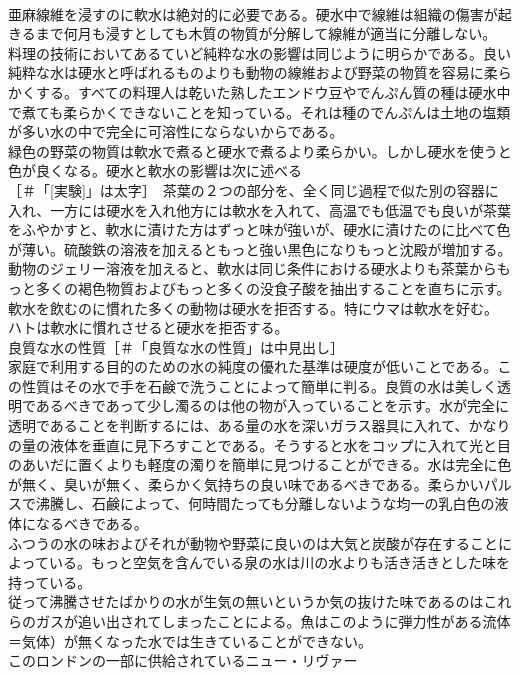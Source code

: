 \documentclass[8pt]{extreport}
\begin{document}
\begin{CJK}{UTF8}{min}
\\	亜麻線維を浸すのに軟水は絶対的に必要である。硬水中で線維は組織の傷害が起きるまで何月も浸すとしても木質の物質が分解して線維が適当に分離しない。
\\	料理の技術においてあるていど純粋な水の影響は同じように明らかである。良い純粋な水は硬水と呼ばれるものよりも動物の線維および野菜の物質を容易に柔らかくする。すべての料理人は乾いた熟したエンドウ豆やでんぷん質の種は硬水中で煮ても柔らかくできないことを知っている。それは種のでんぷんは土地の塩類が多い水の中で完全に可溶性にならないからである。
\\	緑色の野菜の物質は軟水で煮ると硬水で煮るより柔らかい。しかし硬水を使うと色が良くなる。硬水と軟水の影響は次に述べる
\\	[実験]［＃「[実験]」は太字］　茶葉の２つの部分を、全く同じ過程で似た別の容器に入れ、一方には硬水を入れ他方には軟水を入れて、高温でも低温でも良いが茶葉をふやかすと、軟水に漬けた方はずっと味が強いが、硬水に漬けたのに比べて色が薄い。硫酸鉄の溶液を加えるともっと強い黒色になりもっと沈殿が増加する。動物のジェリー溶液を加えると、軟水は同じ条件における硬水よりも茶葉からもっと多くの褐色物質およびもっと多くの没食子酸を抽出することを直ちに示す。
\\	軟水を飲むのに慣れた多くの動物は硬水を拒否する。特にウマは軟水を好む。ハトは軟水に慣れさせると硬水を拒否する。
\\	良質な水の性質［＃「良質な水の性質」は中見出し］
\\	家庭で利用する目的のための水の純度の優れた基準は硬度が低いことである。この性質はその水で手を石鹸で洗うことによって簡単に判る。良質の水は美しく透明であるべきであって少し濁るのは他の物が入っていることを示す。水が完全に透明であることを判断するには、ある量の水を深いガラス器具に入れて、かなりの量の液体を垂直に見下ろすことである。そうすると水をコップに入れて光と目のあいだに置くよりも軽度の濁りを簡単に見つけることができる。水は完全に色が無く、臭いが無く、柔らかく気持ちの良い味であるべきである。柔らかいパルスで沸騰し、石鹸によって、何時間たっても分離しないような均一の乳白色の液体になるべきである。
\\	ふつうの水の味およびそれが動物や野菜に良いのは大気と炭酸が存在することによっている。もっと空気を含んでいる泉の水は川の水よりも活き活きとした味を持っている。
\\	従って沸騰させたばかりの水が生気の無いというか気の抜けた味であるのはこれらのガスが追い出されてしまったことによる。魚はこのように弾力性がある流体
\\	＝気体）が無くなった水では生きていることができない。
\\	このロンドンの一部に供給されているニュー・リヴァー

\end{CJK}
\end{document}
